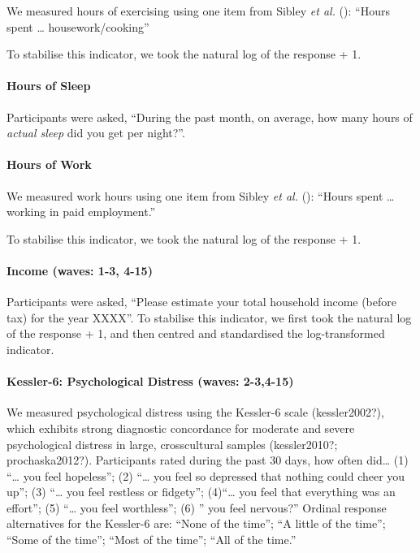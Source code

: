 \documentclass[
  single column]{article}
\let\oldparagraph\paragraph
\renewcommand{\paragraph}[1]{\oldparagraph{#1}\mbox{}}
\begin{document}
We measured hours of exercising using one item from Sibley \emph{et al.}
(): ``Hours spent \ldots{}
housework/cooking''

To stabilise this indicator, we took the natural log of the response +
1.

\paragraph{Hours of Sleep}\label{hours-of-sleep}

Participants were asked, ``During the past month, on average, how many
hours of \emph{actual sleep} did you get per night?''.

\paragraph{Hours of Work}\label{hours-of-work}

We measured work hours using one item from Sibley \emph{et al.}
(): ``Hours spent \ldots{} working in
paid employment.''

To stabilise this indicator, we took the natural log of the response +
1.

\paragraph{Income (waves: 1-3, 4-15)}\label{income-waves-1-3-4-15}

Participants were asked, ``Please estimate your total household income
(before tax) for the year XXXX''. To stabilise this indicator, we first
took the natural log of the response + 1, and then centred and
standardised the log-transformed indicator.

\paragraph{Kessler-6: Psychological Distress (waves:
2-3,4-15)}\label{kessler-6-psychological-distress-waves-2-34-15}

We measured psychological distress using the Kessler-6 scale
(kessler2002?), which exhibits strong diagnostic concordance for
moderate and severe psychological distress in large, crosscultural
samples (kessler2010?; prochaska2012?). Participants rated during the
past 30 days, how often did\ldots{} (1) ``\ldots{} you feel hopeless'';
(2) ``\ldots{} you feel so depressed that nothing could cheer you up'';
(3) ``\ldots{} you feel restless or fidgety''; (4)``\ldots{} you feel
that everything was an effort''; (5) ``\ldots{} you feel worthless'';
(6) '' you feel nervous?'' Ordinal response alternatives for the
Kessler-6 are: ``None of the time''; ``A little of the time''; ``Some of
the time''; ``Most of the time''; ``All of the time.''
\end{document}
